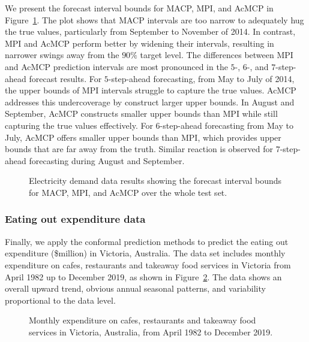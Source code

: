 \documentclass[
  11pt,
  a4paper,
]{article}
\theoremstyle{plain}
\theoremstyle{remark}
\begin{document}
We present the forecast interval bounds for MACP, MPI, and AcMCP in
Figure~\ref{fig-elec_timeplot}. The plot shows that MACP intervals are
too narrow to adequately hug the true values, particularly from
September to November of 2014. In contrast, MPI and AcMCP perform better
by widening their intervals, resulting in narrower swings away from the
\(90\%\) target level. The differences between MPI and AcMCP prediction
intervals are most pronounced in the \(5\)-, \(6\)-, and
\(7\)-step-ahead forecast results. For \(5\)-step-ahead forecasting,
from May to July of 2014, the upper bounds of MPI intervals struggle to
capture the true values. AcMCP addresses this undercoverage by construct
larger upper bounds. In August and September, AcMCP constructs smaller
upper bounds than MPI while still capturing the true values effectively.
For \(6\)-step-ahead forecasting from May to July, AcMCP offers smaller
upper bounds than MPI, which provides upper bounds that are far away
from the truth. Similar reaction is observed for \(7\)-step-ahead
forecasting during August and September.

\begin{figure}


\caption{\label{fig-elec_timeplot}Electricity demand data results
showing the forecast interval bounds for MACP, MPI, and AcMCP over the
whole test set.}

\end{figure}%

\subsubsection{Eating out expenditure
data}\label{eating-out-expenditure-data}

Finally, we apply the conformal prediction methods to predict the eating
out expenditure (\$million) in Victoria, Australia. The data set
includes monthly expenditure on cafes, restaurants and takeaway food
services in Victoria from April 1982 up to December 2019, as shown in
Figure~\ref{fig-cafe_data}. The data shows an overall upward trend,
obvious annual seasonal patterns, and variability proportional to the
data level.

\begin{figure}


\caption{\label{fig-cafe_data}Monthly expenditure on cafes, restaurants
and takeaway food services in Victoria, Australia, from April 1982 to
December 2019.}

\end{figure}%
\end{document}
